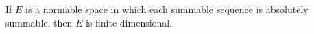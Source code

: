 If $E$ is a normable space in which each summable sequence is absolutely summable, then $E$ is finite dimensional.
